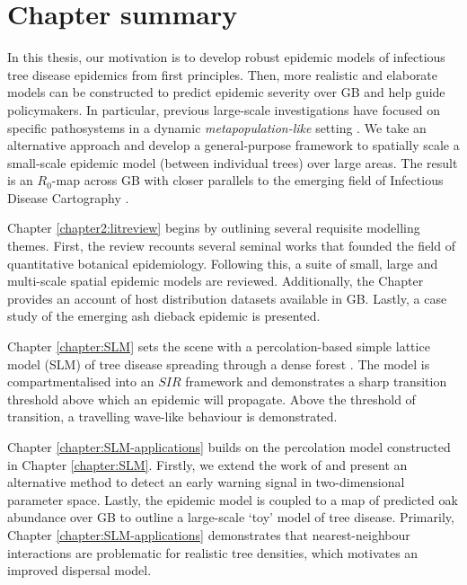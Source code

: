 \section{Chapter summary}

In this thesis, our motivation is to develop robust epidemic models of infectious tree disease
epidemics from first principles. Then, more realistic and elaborate models can be constructed to
predict epidemic severity over GB and help guide policymakers. 
In particular, previous large-scale investigations
have focused on specific pathosystems in a dynamic \textit{metapopulation-like} setting
\cite{large-scale-control, meentemeyer2011epidemiological, harwood2009epidemiological}. We take
an alternative approach and develop a general-purpose framework to spatially scale a small-scale epidemic
model (between individual trees) over large areas. The result is an $R_0$-map across GB with closer parallels
to the emerging field of Infectious Disease Cartography \cite{otieno2021modeling, KRAEMER201619, messina2016mapping}.

Chapter \ref{chapter2:litreview} begins by outlining several requisite modelling themes. First, the review recounts
several seminal works that founded the field of quantitative botanical epidemiology. Following this,
a suite of small, large and multi-scale spatial epidemic models are reviewed. Additionally,
the Chapter provides an account of host distribution datasets available in GB. Lastly, a case study of the emerging
ash dieback epidemic is presented.

Chapter \ref{chapter:SLM} sets the scene with a percolation-based simple lattice model (SLM) of tree
disease spreading through a dense forest \cite{OROZCOFUENTES201912}. The model is compartmentalised
into an $SIR$ framework and demonstrates a sharp transition threshold above which an epidemic will propagate. 
Above the threshold of transition, a travelling wave-like behaviour is demonstrated.

Chapter \ref{chapter:SLM-applications} builds on the percolation model constructed in Chapter \ref{chapter:SLM}.
Firstly, we extend the work of \cite{OROZCOFUENTES201912} and present an alternative method to detect an early
warning signal in two-dimensional parameter space. Lastly, the epidemic model is coupled to a map of predicted
oak abundance over GB \cite{hill.data} to outline a large-scale `toy' model of tree disease. 
Primarily, Chapter \ref{chapter:SLM-applications} demonstrates that nearest-neighbour interactions are problematic
for realistic tree densities, which motivates an improved dispersal model. 

